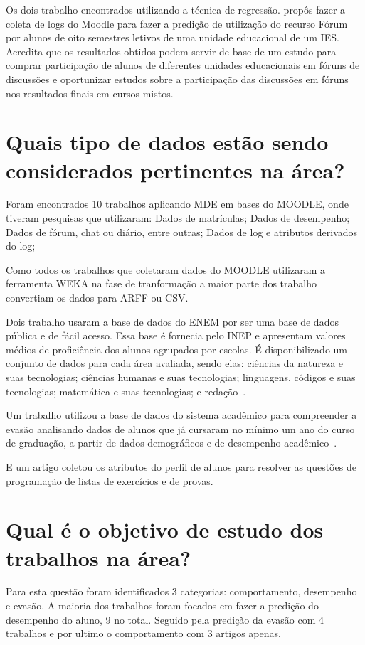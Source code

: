 \documentclass[ti]{texufpel} %
\begin{document}
Os dois trabalho encontrados utilizando a técnica de regressão. \cite{da2012minerando} propôs fazer a coleta de logs do Moodle para fazer a predição de utilização do recurso Fórum por alunos de oito semestres letivos de uma unidade educacional de um IES. Acredita que os  resultados obtidos podem servir de base de um estudo para comprar participação de alunos de diferentes unidades educacionais em fóruns de discussões e oportunizar estudos sobre a participação das discussões em fóruns nos resultados finais em cursos mistos.
 
\section{Quais tipo de dados estão sendo considerados pertinentes na área?}

Foram encontrados 10 trabalhos aplicando MDE em bases do MOODLE, onde tiveram pesquisas que utilizaram: Dados de matrículas; Dados de desempenho; Dados de fórum, chat ou diário, entre outras; Dados de log e atributos derivados do log;

Como todos os trabalhos que coletaram dados do MOODLE utilizaram a ferramenta WEKA na fase de tranformação a maior parte dos trabalho convertiam os dados para ARFF ou CSV.

Dois trabalho usaram a base de dados do ENEM por ser uma base de dados pública e de fácil acesso. Essa base é fornecia pelo INEP e apresentam valores médios de proficiência dos alunos agrupados por escolas. É disponibilizado um conjunto de dados para cada área avaliada, sendo elas: ciências da natureza e suas tecnologias; ciências humanas e suas tecnologias; linguagens, códigos e suas tecnologias; matemática e suas tecnologias; e redação~\cite{simon2017mineraccao}.

Um trabalho utilizou a base de dados do sistema acadêmico para compreender a evasão analisando dados de alunos que já cursaram no mínimo um ano do curso de graduação, a partir de dados demográficos e de desempenho acadêmico~\cite{lanes2018prediccao}.

E um artigo coletou os atributos do perfil de alunos para resolver as questões de programação de listas de exercícios e de provas.

\section{Qual é o objetivo de estudo dos trabalhos na área?}

Para esta questão foram identificados 3 categorias: comportamento, desempenho e evasão. A maioria dos trabalhos foram focados em fazer a predição do desempenho do aluno, 9 no total. Seguido pela predição da evasão com 4 trabalhos e por ultimo o comportamento com 3 artigos apenas.
\end{document}
